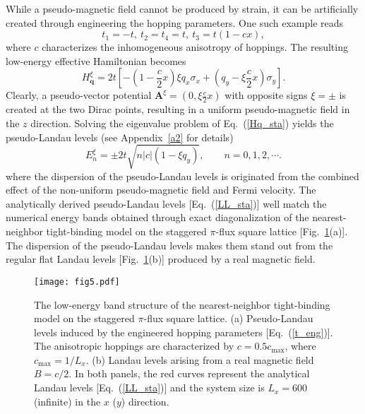 \documentclass[aps, twocolumn, floatfix, superscriptaddress, prb]{revtex4-1}
\begin{document}
While a pseudo-magnetic field cannot be produced by strain, it can be artificially created through engineering the hopping parameters. One such example reads
%
\begin{equation}\label{t_eng}
t_1=-t,\ t_2=t_4=t,\ t_3=t(1-cx),
\end{equation}
%
where $c$ characterizes the inhomogeneous anisotropy of hoppings. The resulting low-energy effective Hamiltonian becomes
%
\begin{equation}\label{Hq_sta}
  H_{\bm q}^\xi=2t\left[-\left(1-\frac{c}{2}x\right)\xi q_x\sigma_x+\left(q_y -\xi\frac{c}{2}x\right)\sigma_y\right].
\end{equation}
%
Clearly, a pseudo-vector potential $\bm A^\xi=(0, \xi\tfrac{c}{2}x)$ with opposite signs $\xi=\pm$ is created at the two Dirac points, resulting in a uniform pseudo-magnetic field in the $z$ direction. Solving the eigenvalue problem of Eq.~(\ref{Hq_sta}) yields the pseudo-Landau levels (see Appendix~\ref{a2} for details)
%
\begin{equation}\label{LL_sta}
E_n^\xi=\pm2t\sqrt{n{|c|}(1-\xi q_y)},\qquad n=0,1,2,\cdots.
\end{equation}
%
{where the dispersion of the pseudo-Landau levels is originated from the combined effect of the non-uniform pseudo-magnetic field and Fermi velocity. The analytically derived pseudo-Landau levels [Eq.~(\ref{LL_sta})] well match the numerical energy bands obtained through exact diagonalization of the nearest-neighbor tight-binding model on the staggered $\pi$-flux square lattice [Fig.~\ref{fig5}(a)]. The dispersion of the pseudo-Landau levels makes them stand out from the regular flat Landau levels [Fig.~\ref{fig5}(b)] produced by a real magnetic field.}


%
\begin{figure}[t]
\centering
\texttt{[image: fig5.pdf]}
\caption{The low-energy band structure of the nearest-neighbor tight-binding model on the staggered $\pi$-flux square lattice. (a) Pseudo-Landau levels induced by the engineered hopping parameters [Eq.~(\ref{t_eng})]. The anisotropic hoppings are characterized by $c=0.5c_{\text{max}}$, where $c_{\text{max}}=1/L_x$. (b) Landau levels arising from a real magnetic field $B=c/2$. In both panels, the red curves represent the analytical Landau levels [Eq.~(\ref{LL_sta})] and the system size is $L_x=600$ (infinite) in the $x$ ($y$) direction.
}\label{fig5}
\end{figure}
%
\end{document}
